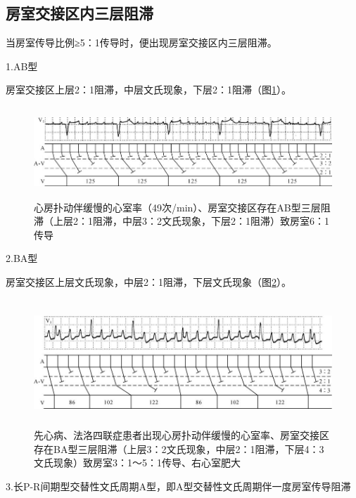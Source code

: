 \protect\hypertarget{text00031.htmlux5cux23subid366}{}{}

\subsection{房室交接区内三层阻滞}

当房室传导比例≥5：1传导时，便出现房室交接区内三层阻滞。

1.AB型

房室交接区上层2：1阻滞，中层文氏现象，下层2：1阻滞（图\ref{fig24-9}）。

\begin{figure}[!htbp]
 \centering
 \includegraphics[width=5.82292in,height=1.34375in]{./images/Image00404.jpg}
 \captionsetup{justification=centering}
 \caption{心房扑动伴缓慢的心室率（49次/min）、房室交接区存在AB型三层阻滞（上层2：1阻滞，中层3：2文氏现象，下层2：1阻滞）致房室6：1传导}
 \label{fig24-9}
  \end{figure} 

2.BA型

房室交接区上层文氏现象，中层2：1阻滞，下层文氏现象（图\ref{fig24-10}）。

\begin{figure}[!htbp]
 \centering
 \includegraphics[width=6in,height=1.875in]{./images/Image00405.jpg}
 \captionsetup{justification=centering}
 \caption{先心病、法洛四联症患者出现心房扑动伴缓慢的心室率、房室交接区存在BA型三层阻滞（上层3：2文氏现象，中层2：1阻滞，下层4：3文氏现象）致房室3：1～5：1传导、右心室肥大}
 \label{fig24-10}
  \end{figure} 

3.长P-R间期型交替性文氏周期A型，即A型交替性文氏周期伴一度房室传导阻滞

